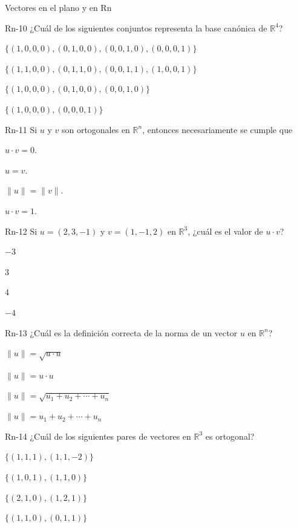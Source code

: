 \documentclass[a4,11pt]{aleph-notas}
\begin{document}
\begin{quiz}{Vectores en el plano y en Rn}
\begin{multi}[]%
    {Rn-10}
    ¿Cuál de los siguientes conjuntos representa la base canónica de \(\mathbb{R}^4\)?
    \item* \(\{(1,0,0,0),(0,1,0,0),(0,0,1,0),(0,0,0,1)\}\)
    \item \(\{(1,1,0,0),(0,1,1,0),(0,0,1,1),(1,0,0,1)\}\)
    \item \(\{(1,0,0,0),(0,1,0,0),(0,0,1,0)\}\)
    \item \(\{(1,0,0,0),(0,0,0,1)\}\)
\end{multi}

\begin{multi}[]%
    {Rn-11}
    Si \(u\) y \(v\) son ortogonales en \(\mathbb{R}^n\), entonces necesariamente se cumple que
    \item* \(u\cdot v=0\).
    \item \(u=v\).
    \item \(\|u\|=\|v\|\).
    \item \(u\cdot v=1\).
\end{multi}

\begin{multi}[]%
    {Rn-12}
    Si \(u=(2,3,-1)\) y \(v=(1,-1,2)\) en \(\mathbb{R}^3\), ¿cuál es el valor de \(u\cdot v\)?
    \item* \(-3\)
    \item \(3\)
    \item \(4\)
    \item \(-4\)
\end{multi}

\begin{multi}[]%
    {Rn-13}
    ¿Cuál es la definición correcta de la norma de un vector \(u\) en \(\mathbb{R}^n\)?
    \item* \(\|u\| = \sqrt{u \cdot u}\)
    \item \(\|u\| = u \cdot u\)
    \item \(\|u\| = \sqrt{u_1 + u_2 + \cdots + u_n}\)
    \item \(\|u\| = u_1 + u_2 + \cdots + u_n\)
\end{multi}

\begin{multi}[]%
    {Rn-14}
    ¿Cuál de los siguientes pares de vectores en \(\mathbb{R}^3\) es ortogonal?
    \item* \(\{(1,1,1),(1,1,-2)\}\)
    \item \(\{(1,0,1),(1,1,0)\}\)
    \item \(\{(2,1,0),(1,2,1)\}\)
    \item \(\{(1,1,0),(0,1,1)\}\)
\end{multi}

\end{quiz}
\end{document}
